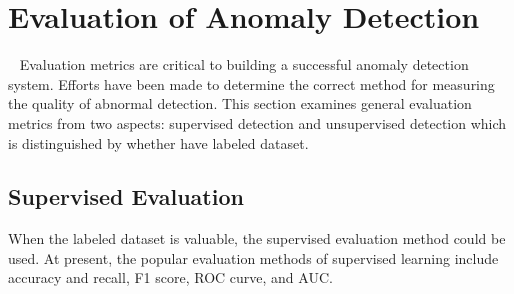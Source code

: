 
\section{Evaluation of Anomaly Detection}~\label{sec:evaluate}
Evaluation metrics are critical to building a 
successful anomaly detection system. 
Efforts have been made to determine the 
correct method for measuring the quality of abnormal detection. 
This section examines general evaluation metrics from two aspects: 
supervised detection
and unsupervised detection which is
distinguished by whether have labeled dataset.

\subsection{Supervised Evaluation}
When the labeled dataset is valuable,
the supervised evaluation method could be used.
At present,
the popular evaluation methods of supervised learning
include accuracy and recall,
F1 score,
ROC curve,
and AUC.

